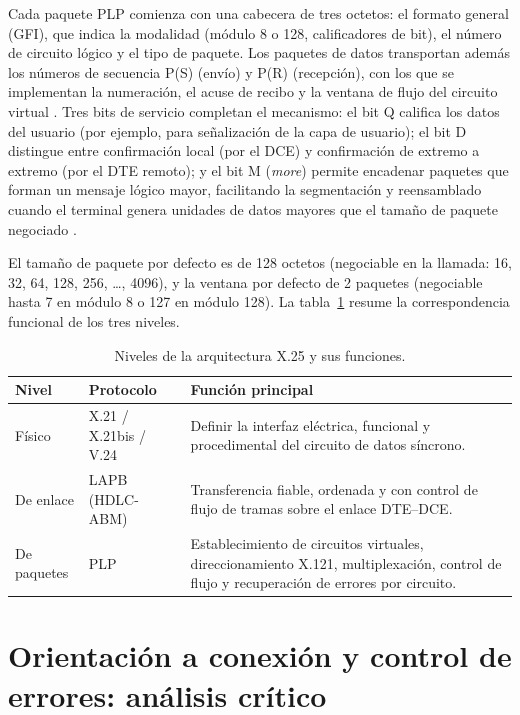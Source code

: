 \documentclass[12pt,a4paper]{article}
\begin{document}
Cada paquete PLP comienza con una cabecera de tres octetos: el formato general (GFI), que indica la modalidad (módulo 8 o 128, calificadores de bit), el número de circuito lógico y el tipo de paquete. Los paquetes de datos transportan además los números de secuencia P(S) (envío) y P(R) (recepción), con los que se implementan la numeración, el acuse de recibo y la ventana de flujo del circuito virtual \cite{itux25, stallings2004}. Tres bits de servicio completan el mecanismo: el bit Q califica los datos del usuario (por ejemplo, para señalización de la capa de usuario); el bit D distingue entre confirmación local (por el DCE) y confirmación de extremo a extremo (por el DTE remoto); y el bit M (\emph{more}) permite encadenar paquetes que forman un mensaje lógico mayor, facilitando la segmentación y reensamblado cuando el terminal genera unidades de datos mayores que el tamaño de paquete negociado \cite{rybczynski1980}.

El tamaño de paquete por defecto es de 128 octetos (negociable en la llamada: 16, 32, 64, 128, 256, \dots, 4096), y la ventana por defecto de 2 paquetes (negociable hasta 7 en módulo 8 o 127 en módulo 128). La tabla~\ref{tab:niveles} resume la correspondencia funcional de los tres niveles.

\begin{table}[h]
    \centering
    \small
    \begin{tabularx}{\textwidth}{l l X}
        \toprule
        \textbf{Nivel} & \textbf{Protocolo} & \textbf{Función principal} \\
        \midrule
        Físico    & X.21 / X.21bis / V.24 & Definir la interfaz eléctrica, funcional y procedimental del circuito de datos síncrono. \\
        De enlace & LAPB (HDLC-ABM)       & Transferencia fiable, ordenada y con control de flujo de tramas sobre el enlace DTE--DCE. \\
        De paquetes & PLP                 & Establecimiento de circuitos virtuales, direccionamiento X.121, multiplexación, control de flujo y recuperación de errores por circuito. \\
        \bottomrule
    \end{tabularx}
    \caption{Niveles de la arquitectura X.25 y sus funciones.}
    \label{tab:niveles}
\end{table}

\section{Orientación a conexión y control de errores: análisis crítico}
\end{document}
